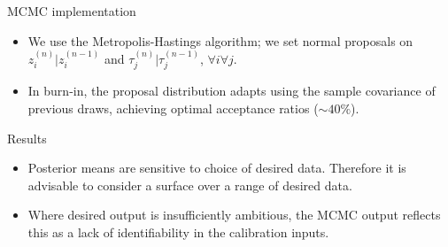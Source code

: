 \documentclass[final]{beamer}
\newlength{\onecolwid}
\begin{document}
\begin{frame}[t]
\begin{columns}[t]
\begin{column}{\onecolwid}
\begin{alertblock}{MCMC implementation}
\begin{itemize}
\item We use the Metropolis-Hastings %
algorithm\cite{Hastings1970}; we set normal proposals on $z_i^{(n)}|z_i^{(n-1)}$ and $\tau_j^{(n)}|\tau_j^{(n-1)}$, $\forall i \forall j$.

\item In burn-in, the proposal distribution adapts using the sample covariance of previous draws, achieving optimal acceptance ratios ($\sim40\%$).

\end{itemize}



\end{alertblock}


\begin{alertblock}{Results}


\begin{figure}[h!]
\label{res}
\end{figure}

\vspace{-24mm}
\begin{itemize}
\item Posterior means are sensitive to choice of desired data. Therefore it is advisable to consider a surface over a range of desired data.
\item Where desired output is insufficiently ambitious, the MCMC output reflects this as a lack of identifiability in the calibration inputs.
\end{itemize}

\vspace{-4mm}
\begin{figure}[h!]
\label{unident}
\end{figure}

\vspace{-20mm}
\end{alertblock}


%
%


\end{column}
\end{columns}
\end{frame}
\end{document}
